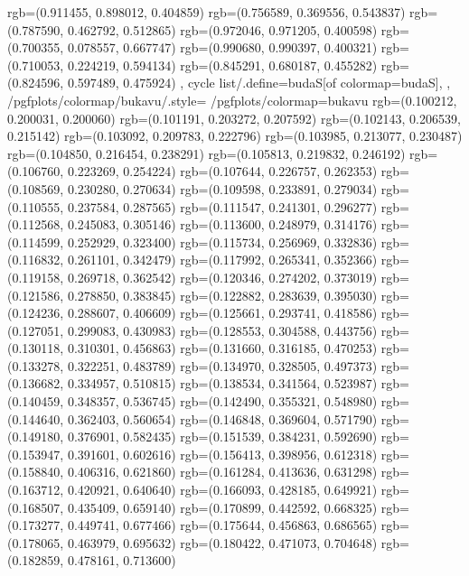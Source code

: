 {{{					rgb=(0.911455, 0.898012, 0.404859)
					rgb=(0.756589, 0.369556, 0.543837)
					rgb=(0.787590, 0.462792, 0.512865)
					rgb=(0.972046, 0.971205, 0.400598)
					rgb=(0.700355, 0.078557, 0.667747)
					rgb=(0.990680, 0.990397, 0.400321)
					rgb=(0.710053, 0.224219, 0.594134)
					rgb=(0.845291, 0.680187, 0.455282)
					rgb=(0.824596, 0.597489, 0.475924)
			},
		cycle list/.define={budaS}{[of colormap=budaS]},
		},
		/pgfplots/colormap/bukavu/.style={
			/pgfplots/colormap={bukavu}{%
					rgb=(0.100212, 0.200031, 0.200060)
					rgb=(0.101191, 0.203272, 0.207592)
					rgb=(0.102143, 0.206539, 0.215142)
					rgb=(0.103092, 0.209783, 0.222796)
					rgb=(0.103985, 0.213077, 0.230487)
					rgb=(0.104850, 0.216454, 0.238291)
					rgb=(0.105813, 0.219832, 0.246192)
					rgb=(0.106760, 0.223269, 0.254224)
					rgb=(0.107644, 0.226757, 0.262353)
					rgb=(0.108569, 0.230280, 0.270634)
					rgb=(0.109598, 0.233891, 0.279034)
					rgb=(0.110555, 0.237584, 0.287565)
					rgb=(0.111547, 0.241301, 0.296277)
					rgb=(0.112568, 0.245083, 0.305146)
					rgb=(0.113600, 0.248979, 0.314176)
					rgb=(0.114599, 0.252929, 0.323400)
					rgb=(0.115734, 0.256969, 0.332836)
					rgb=(0.116832, 0.261101, 0.342479)
					rgb=(0.117992, 0.265341, 0.352366)
					rgb=(0.119158, 0.269718, 0.362542)
					rgb=(0.120346, 0.274202, 0.373019)
					rgb=(0.121586, 0.278850, 0.383845)
					rgb=(0.122882, 0.283639, 0.395030)
					rgb=(0.124236, 0.288607, 0.406609)
					rgb=(0.125661, 0.293741, 0.418586)
					rgb=(0.127051, 0.299083, 0.430983)
					rgb=(0.128553, 0.304588, 0.443756)
					rgb=(0.130118, 0.310301, 0.456863)
					rgb=(0.131660, 0.316185, 0.470253)
					rgb=(0.133278, 0.322251, 0.483789)
					rgb=(0.134970, 0.328505, 0.497373)
					rgb=(0.136682, 0.334957, 0.510815)
					rgb=(0.138534, 0.341564, 0.523987)
					rgb=(0.140459, 0.348357, 0.536745)
					rgb=(0.142490, 0.355321, 0.548980)
					rgb=(0.144640, 0.362403, 0.560654)
					rgb=(0.146848, 0.369604, 0.571790)
					rgb=(0.149180, 0.376901, 0.582435)
					rgb=(0.151539, 0.384231, 0.592690)
					rgb=(0.153947, 0.391601, 0.602616)
					rgb=(0.156413, 0.398956, 0.612318)
					rgb=(0.158840, 0.406316, 0.621860)
					rgb=(0.161284, 0.413636, 0.631298)
					rgb=(0.163712, 0.420921, 0.640640)
					rgb=(0.166093, 0.428185, 0.649921)
					rgb=(0.168507, 0.435409, 0.659140)
					rgb=(0.170899, 0.442592, 0.668325)
					rgb=(0.173277, 0.449741, 0.677466)
					rgb=(0.175644, 0.456863, 0.686565)
					rgb=(0.178065, 0.463979, 0.695632)
					rgb=(0.180422, 0.471073, 0.704648)
					rgb=(0.182859, 0.478161, 0.713600)
}}}
